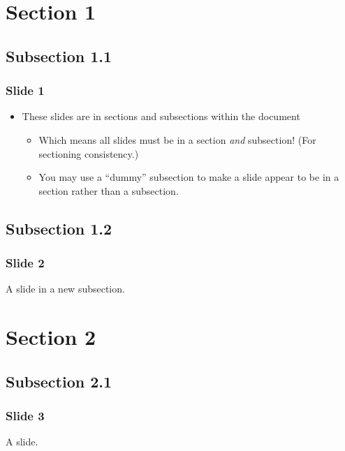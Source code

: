 \documentclass[t]{beamer}
\begin{document}
\section{Section 1%
  \label{section-1}%
}


\subsection{Subsection 1.1%
  \label{subsection-1-1}%
}

\begin{frame}[fragile]
\frametitle{Slide 1}

\begin{itemize}[<+-| alert@+>]

\item These slides are in sections and subsections within the document
\begin{itemize}[<+-| alert@+>]

\item Which means all slides must be in a section
\emph{and} subsection! (For sectioning consistency.)

\item You may use a ``dummy'' subsection to make a slide appear to be in a
section rather than a subsection.
\end{itemize}
\end{itemize}

\end{frame}


\subsection{Subsection 1.2%
  \label{subsection-1-2}%
}

\begin{frame}[fragile]
\frametitle{Slide 2}


A slide in a new subsection.

\end{frame}


\section{Section 2%
  \label{section-2}%
}


\subsection{Subsection 2.1%
  \label{subsection-2-1}%
}

\begin{frame}[fragile]
\frametitle{Slide 3}


A slide.

\end{frame}
\end{document}
